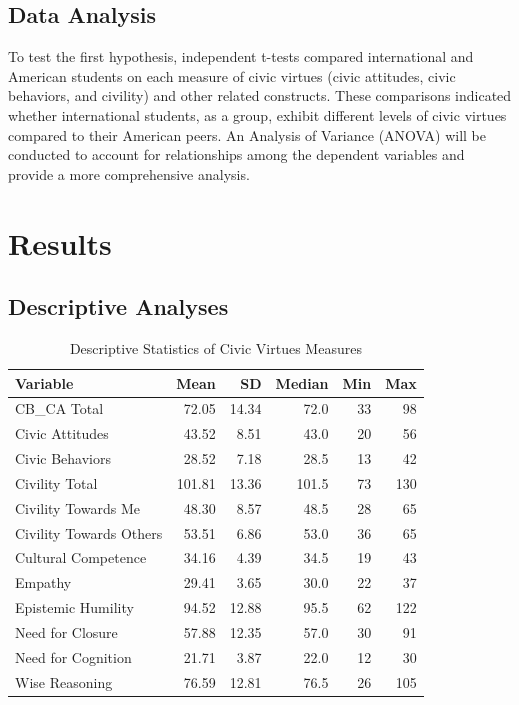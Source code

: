 \documentclass[
  man,
  floatsintext,
  longtable,
  nolmodern,
  notxfonts,
  notimes,
  colorlinks=true,linkcolor=blue,citecolor=blue,urlcolor=blue]{apa7}
\begin{document}
\subsection{Data Analysis}\label{data-analysis}

To test the first hypothesis, independent t-tests compared international
and American students on each measure of civic virtues (civic attitudes,
civic behaviors, and civility) and other related constructs. These
comparisons indicated whether international students, as a group,
exhibit different levels of civic virtues compared to their American
peers. An Analysis of Variance (ANOVA) will be conducted to account for
relationships among the dependent variables and provide a more
comprehensive analysis.

\section{Results}\label{results}

\subsection{Descriptive Analyses}\label{descriptive-analyses}

\begin{table}

{\caption{{Descriptive Statistics of Civic Virtues
Measures}{\label{tbl-descriptive-stats}}}
\vspace{-20pt}}

\begin{tabular}[t]{lrrrrr}
\toprule
Variable & Mean & SD & Median & Min & Max\\
\midrule
CB\_CA Total & 72.05 & 14.34 & 72.0 & 33 & 98\\
Civic Attitudes & 43.52 & 8.51 & 43.0 & 20 & 56\\
Civic Behaviors & 28.52 & 7.18 & 28.5 & 13 & 42\\
Civility Total & 101.81 & 13.36 & 101.5 & 73 & 130\\
Civility Towards Me & 48.30 & 8.57 & 48.5 & 28 & 65\\
\addlinespace
Civility Towards Others & 53.51 & 6.86 & 53.0 & 36 & 65\\
Cultural Competence & 34.16 & 4.39 & 34.5 & 19 & 43\\
Empathy & 29.41 & 3.65 & 30.0 & 22 & 37\\
Epistemic Humility & 94.52 & 12.88 & 95.5 & 62 & 122\\
Need for Closure & 57.88 & 12.35 & 57.0 & 30 & 91\\
\addlinespace
Need for Cognition & 21.71 & 3.87 & 22.0 & 12 & 30\\
Wise Reasoning & 76.59 & 12.81 & 76.5 & 26 & 105\\
\bottomrule
\end{tabular}

\end{table}
\end{document}
